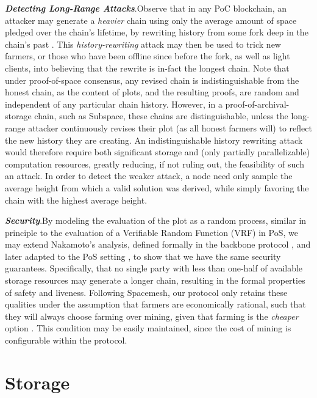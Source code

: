 \documentclass[conference]{IEEEtran}
\begin{document}
\noindent \textbf{\textit{Detecting Long-Range Attacks}}.\quad Observe that in any PoC blockchain, an attacker may generate a \textit{heavier} chain using only the average amount of space pledged over the chain's lifetime, by rewriting history from some fork deep in the chain’s past \cite{park2018spacemint,cohen2019chia}. This \textit{history-rewriting} attack may then be used to trick new farmers, or those who have been offline since before the fork, as well as light clients, into believing that the rewrite is in-fact the longest chain. Note that under proof-of-space consensus, any revised chain is indistinguishable from the honest chain, as the content of plots, and the resulting proofs, are random and independent of any particular chain history. However, in a proof-of-archival-storage chain, such as Subspace, these chains are distinguishable, unless the long-range attacker continuously revises their plot (as all honest farmers will) to reflect the new history they are creating. An indistinguishable history rewriting attack would therefore require both significant storage and (only partially parallelizable) computation resources, greatly reducing, if not ruling out, the feasibility of such an attack. In order to detect the weaker attack, a node need only sample the average height from which a valid solution was derived, while simply favoring the chain with the highest average height.

\vspace{2mm}

\noindent \textbf{\textit{Security}}.\quad By modeling the evaluation of the plot as a random process, similar in principle to the evaluation of a Verifiable Random Function (VRF) in PoS, we may extend Nakamoto’s analysis, defined formally in the backbone protocol \cite{garay2015bitcoin}, and later adapted to the PoS setting \cite{kiayias2017ouroboros}, to show that we have the same security guarantees. Specifically, that no single party with less than one-half of available storage resources may generate a longer chain, resulting in the formal properties of safety and liveness. Following Spacemesh, our protocol only retains these qualities under the assumption that farmers are economically rational, such that they will always choose farming over mining, given that farming is the \textit{cheaper} option \cite{moran2019simple}. This condition may be easily maintained, since the cost of mining is configurable within the protocol.

\section{Storage}
\end{document}
